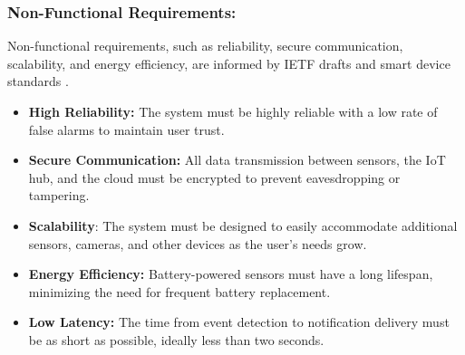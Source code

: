 \documentclass[conference]{IEEEtran}
\begin{document}
\subsubsection{\textbf{Non-Functional Requirements:}}Non-functional requirements, such as reliability, secure communication, scalability, and energy efficiency, are informed by IETF drafts and smart device standards \cite{wang_iot_devices_security_2024}.
\begin{itemize}
    \item \textbf{High Reliability:} The system must be highly reliable with a low rate of false alarms to maintain user trust.
    \item \textbf{Secure Communication:} All data transmission between sensors, the IoT hub, and the cloud must be encrypted to prevent eavesdropping or tampering.
    \item \textbf{Scalability}: The system must be designed to easily accommodate additional sensors, cameras, and other devices as the user’s needs grow.
    \item \textbf{Energy Efficiency:} Battery-powered sensors must have a long lifespan, minimizing the need for frequent battery replacement.
    \item \textbf{Low Latency:} The time from event detection to notification delivery must be as short as possible, ideally less than two seconds.
\end{itemize}


\end{document}
